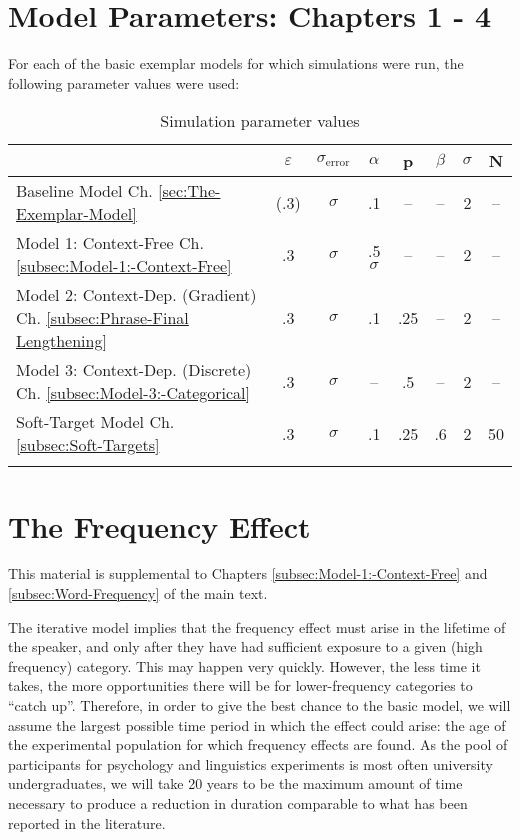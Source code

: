 \chapter{\label{chap:Appendix A}Model Parameters: Chapters 1 - 4}

For each of the basic exemplar models for which simulations were run,
the following parameter values were used:

\begin{table}[H]

\caption{Simulation parameter values}
\begin{tabular}{lScSSScc}
\lsptoprule
 & {$\varepsilon$} & {$\sigma_{\text{error}}$} & $\alpha$ & {p} & {$\beta$} & $\sigma$ & N\tabularnewline
\midrule
Baseline Model Ch. \ref{sec:The-Exemplar-Model} & (.3) & $\sigma$ & .1 & – & – & 2 & –\tabularnewline
Model 1: Context-Free Ch. \ref{subsec:Model-1:-Context-Free} & .3 & $\sigma$ & .5$\sigma$ & – & – & 2 & –\tabularnewline
Model 2: Context-Dep. (Gradient) Ch. \ref{subsec:Phrase-Final Lengthening} & .3 & $\sigma$ & .1 & .25 & – & 2 & –\tabularnewline
Model 3: Context-Dep. (Discrete) Ch. \ref{subsec:Model-3:-Categorical} & .3 & $\sigma$ & – & .5 & – & 2 & –\tabularnewline
Soft-Target Model Ch. \ref{subsec:Soft-Targets} & .3 & $\sigma$ & .1 & .25 & .6 & 2 & 50\tabularnewline
\lspbottomrule
\end{tabular}

\end{table}


\chapter{\label{chap:Appendix B}The Frequency Effect}

This material is supplemental to Chapters \ref{subsec:Model-1:-Context-Free}
and \ref{subsec:Word-Frequency} of the main text.

The iterative model implies that the frequency effect must arise in
the lifetime of the speaker, and only after they have had sufficient
exposure to a given (high frequency) category. This may happen very
quickly. However, the less time it takes, the more opportunities there
will be for lower-frequency categories to “catch up”. Therefore,
in order to give the best chance to the basic model, we will assume
the largest possible time period in which the effect could arise:
the age of the experimental population for which frequency effects
are found. As the pool of participants for psychology and linguistics
experiments is most often university undergraduates, we will take
20 years to be the maximum amount of time necessary to produce a reduction
in duration comparable to what has been reported in the literature.

